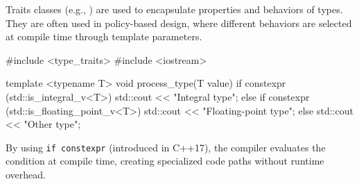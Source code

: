 Traits classes (e.g., ) are used to encapsulate properties and behaviors of types. They are often used in policy-based design, where different behaviors are selected at compile time through template parameters.

\begin{exampleblock}
\begin{codeblock}[language=C++, numbers=none]
#include <type_traits>
#include <iostream>

template <typename T>
void process_type(T value) {
    if constexpr (std::is_integral_v<T>) {
        std::cout << "Integral type\n";
    } else if constexpr (std::is_floating_point_v<T>) {
        std::cout << "Floating-point type\n";
    } else {
        std::cout << "Other type\n";
    }
}
\end{codeblock}
\end{exampleblock}

By using \texttt{if constexpr} (introduced in C++17), the compiler evaluates the condition at compile time, creating specialized code paths without runtime overhead.